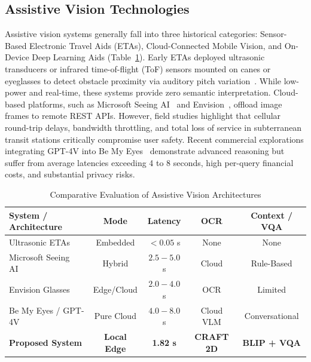 \documentclass[conference]{IEEEtran}
\begin{document}
\subsection{Assistive Vision Technologies}
Assistive vision systems generally fall into three historical categories: Sensor-Based Electronic Travel Aids (ETAs), Cloud-Connected Mobile Vision, and On-Device Deep Learning Aids (Table~\ref{tab:comparison}). Early ETAs deployed ultrasonic transducers or infrared time-of-flight (ToF) sensors mounted on canes or eyeglasses to detect obstacle proximity via auditory pitch variation~\cite{ref:hersh}. While low-power and real-time, these systems provide zero semantic interpretation. Cloud-based platforms, such as Microsoft Seeing AI~\cite{ref:seeingai} and Envision~\cite{ref:envision}, offload image frames to remote REST APIs. However, field studies highlight that cellular round-trip delays, bandwidth throttling, and total loss of service in subterranean transit stations critically compromise user safety. Recent commercial explorations integrating GPT-4V into Be My Eyes~\cite{ref:bemyeyes} demonstrate advanced reasoning but suffer from average latencies exceeding 4 to 8 seconds, high per-query financial costs, and substantial privacy risks.

\begin{table}[htbp]
\caption{Comparative Evaluation of Assistive Vision Architectures}
\begin{center}
\begin{tabular}{lcccc}
\toprule
\textbf{System / Architecture} & \textbf{Mode} & \textbf{Latency} & \textbf{OCR} & \textbf{Context / VQA} \\
\midrule
Ultrasonic ETAs~\cite{ref:hersh} & Embedded & $< 0.05$ s & None & None \\
Microsoft Seeing AI~\cite{ref:seeingai} & Hybrid & $2.5 - 5.0$ s & Cloud & Rule-Based \\
Envision Glasses~\cite{ref:envision} & Edge/Cloud & $2.0 - 4.0$ s & OCR & Limited \\
Be My Eyes / GPT-4V~\cite{ref:bemyeyes} & Pure Cloud & $4.0 - 8.0$ s & Cloud VLM & Conversational \\
\textbf{Proposed System} & \textbf{Local Edge} & \textbf{1.82 s} & \textbf{CRAFT 2D} & \textbf{BLIP + VQA} \\
\bottomrule
\end{tabular}
\label{tab:comparison}
\end{center}
\end{table}
\end{document}
